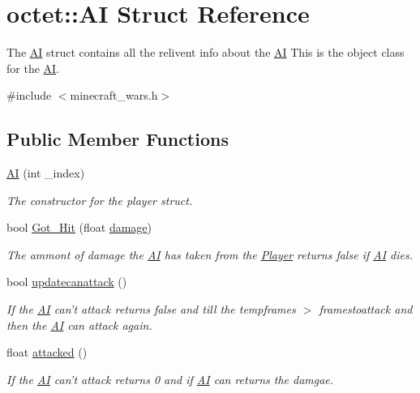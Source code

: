 \hypertarget{structoctet_1_1_a_i}{\section{octet\+:\+:A\+I Struct Reference}
\label{structoctet_1_1_a_i}
}


The \hyperlink{structoctet_1_1_a_i}{A\+I} struct contains all the relivent info about the \hyperlink{structoctet_1_1_a_i}{A\+I} This is the object class for the \hyperlink{structoctet_1_1_a_i}{A\+I}.  




{\ttfamily \#include $<$minecraft\+\_\+wars.\+h$>$}

\subsection*{Public Member Functions}
\begin{DoxyCompactItemize}
\item 
\hyperlink{structoctet_1_1_a_i_af1ba740c2468f2561f339276775b1083}{A\+I} (int \+\_\+index)
\begin{DoxyCompactList}\small\item\em The constructor for the player struct. \end{DoxyCompactList}\item 
bool \hyperlink{structoctet_1_1_a_i_a07f1fe660302de694477627f95c58f56}{Got\+\_\+\+Hit} (float \hyperlink{structoctet_1_1_a_i_a1d0e4f22af8d053827acec1f42cf0f41}{damage})
\begin{DoxyCompactList}\small\item\em The ammont of damage the \hyperlink{structoctet_1_1_a_i}{A\+I} has taken from the \hyperlink{structoctet_1_1_player}{Player} returns false if \hyperlink{structoctet_1_1_a_i}{A\+I} dies. \end{DoxyCompactList}\item 
bool \hyperlink{structoctet_1_1_a_i_a0e1e1d57a6ea0cc3189bed8cc87ef16a}{updatecanattack} ()
\begin{DoxyCompactList}\small\item\em If the \hyperlink{structoctet_1_1_a_i}{A\+I} can't attack returns false and till the tempframes $>$ framestoattack and then the \hyperlink{structoctet_1_1_a_i}{A\+I} can attack again. \end{DoxyCompactList}\item 
float \hyperlink{structoctet_1_1_a_i_a009c0ba8d9eb8ad009772e5fc755aff7}{attacked} ()
\begin{DoxyCompactList}\small\item\em If the \hyperlink{structoctet_1_1_a_i}{A\+I} can't attack returns 0 and if \hyperlink{structoctet_1_1_a_i}{A\+I} can returns the damgae. \end{DoxyCompactList}\end{DoxyCompactItemize}
